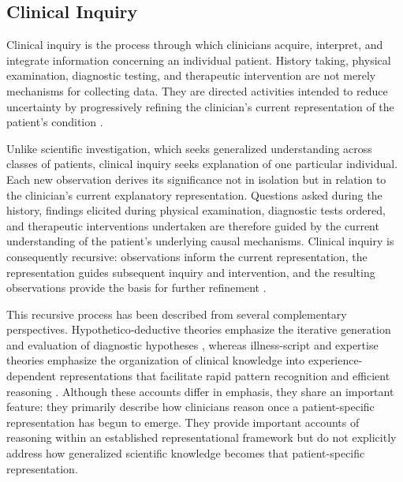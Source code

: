 \documentclass[11pt]{article}
\begin{document}
\subsection{Clinical Inquiry}

Clinical inquiry is the process through which clinicians acquire, interpret, and integrate information concerning an individual patient. History taking, physical examination, diagnostic testing, and therapeutic intervention are not merely mechanisms for collecting data. They are directed activities intended to reduce uncertainty by progressively refining the clinician's current representation of the patient's condition \parencite{collins_dynamic_2014,collins_synthesis_2018}.

Unlike scientific investigation, which seeks generalized understanding across classes of patients, clinical inquiry seeks explanation of one particular individual. Each new observation derives its significance not in isolation but in relation to the clinician's current explanatory representation. Questions asked during the history, findings elicited during physical examination, diagnostic tests ordered, and therapeutic interventions undertaken are therefore guided by the current understanding of the patient's underlying causal mechanisms. Clinical inquiry is consequently recursive: observations inform the current representation, the representation guides subsequent inquiry and intervention, and the resulting observations provide the basis for further refinement \parencite{shoemaker_flight_2023}.

This recursive process has been described from several complementary perspectives. Hypothetico-deductive theories emphasize the iterative generation and evaluation of diagnostic hypotheses \parencite{elstein_medical_1978}, whereas illness-script and expertise theories emphasize the organization of clinical knowledge into experience-dependent representations that facilitate rapid pattern recognition and efficient reasoning \parencite{schmidt_cognitive_1990,charlin_scripts_2007}. Although these accounts differ in emphasis, they share an important feature: they primarily describe how clinicians reason once a patient-specific representation has begun to emerge. They provide important accounts of reasoning within an established representational framework but do not explicitly address how generalized scientific knowledge becomes that patient-specific representation.
\end{document}
